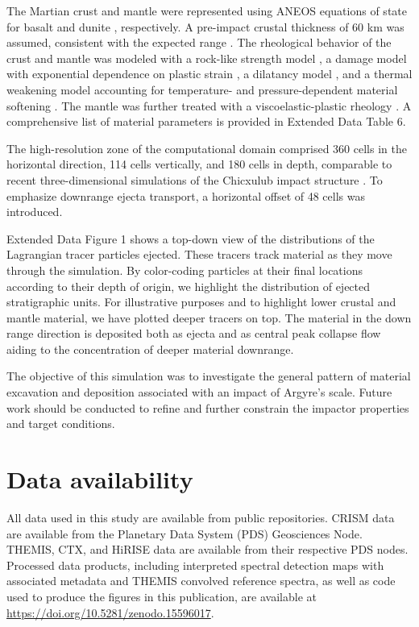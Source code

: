 \documentclass[12pt]{article}
\begin{document}
The Martian crust and mantle were represented using ANEOS equations of state for basalt \citep{Pierazzo2005} and dunite \citep{Benz1989}, respectively. A pre-impact crustal thickness of 60 km was assumed, consistent with the expected range \citep{Neumann2004, Wieczorek2022}. The rheological behavior of the crust and mantle was modeled with a rock-like strength model \citep{Collins2004}, a damage model with exponential dependence on plastic strain \citep{Collins2004, Johnson2016}, a dilatancy model \citep{Collins2014}, and a thermal weakening model accounting for temperature- and pressure-dependent material softening \citep{Ohnaka1995}. The mantle was further treated with a viscoelastic-plastic rheology \citep{Elbeshausen2018}. A comprehensive list of material parameters is provided in Extended Data Table 6.

The high-resolution zone of the computational domain comprised 360 cells in the horizontal direction, 114 cells vertically, and 180 cells in depth, comparable to recent three-dimensional simulations of the Chicxulub impact structure \citep{Collins2020}. To emphasize downrange ejecta transport, a horizontal offset of 48 cells was introduced.

Extended Data Figure 1 shows a top-down view of the distributions of the Lagrangian tracer particles ejected. These tracers track material as they move through the simulation. By color-coding particles at their final locations according to their depth of origin, we highlight the distribution of ejected stratigraphic units. For illustrative purposes and to highlight lower crustal and mantle material, we have plotted deeper tracers on top. The material in the down range direction is deposited both as ejecta and as central peak collapse flow aiding to the concentration of deeper material downrange.

The objective of this simulation was to investigate the general pattern of material excavation and deposition associated with an impact of Argyre’s scale. Future work should be conducted to refine and further constrain the impactor properties and target conditions.

\section*{Data availability}

All data used in this study are available from public repositories. CRISM data are available from the Planetary Data System (PDS) Geosciences Node. THEMIS, CTX, and HiRISE data are available from their respective PDS nodes. Processed data products, including interpreted spectral detection maps with associated metadata and THEMIS convolved reference spectra, as well as code used to produce the figures in this publication, are available at \href{https://doi.org/10.5281/zenodo.15596017}{https://doi.org/10.5281/zenodo.15596017}.
\end{document}
